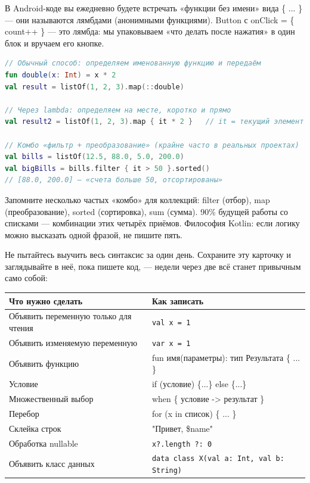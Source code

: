 
В Android-коде вы ежедневно будете встречать «функции без имени» вида \{ ... \} — они называются лямбдами (анонимными функциями). Button с onClick = \{ count++ \} — это лямбда: мы упаковываем «что делать после нажатия» в один блок и вручаем его кнопке.

\begin{lstlisting}[language=Kotlin]
// Обычный способ: определяем именованную функцию и передаём
fun double(x: Int) = x * 2
val result = listOf(1, 2, 3).map(::double)

// Через lambda: определяем на месте, коротко и прямо
val result2 = listOf(1, 2, 3).map { it * 2 }   // it = текущий элемент

// Комбо «фильтр + преобразование» (крайне часто в реальных проектах)
val bills = listOf(12.5, 88.0, 5.0, 200.0)
val bigBills = bills.filter { it > 50 }.sorted()
// [88.0, 200.0] — «счета больше 50, отсортированы»
\end{lstlisting}

Запомните несколько частых «комбо» для коллекций: filter (отбор), map (преобразование), sorted (сортировка), sum (сумма). 90\% будущей работы со списками — комбинации этих четырёх приёмов. Философия Kotlin: если логику можно высказать одной фразой, не пишите пять.


Не пытайтесь выучить весь синтаксис за один день. Сохраните эту карточку и заглядывайте в неё, пока пишете код, — недели через две всё станет привычным само собой:

\begin{center}
\begin{tabularx}{\linewidth}{|X|X|}
\hline
\textbf{Что нужно сделать} & \textbf{Как записать} \tabularnewline
\hline
Объявить переменную только для чтения & \texttt{val x = 1} \tabularnewline
Объявить изменяемую переменную & \texttt{var x = 1} \tabularnewline
Объявить функцию & fun имя(параметры): тип Результата \{ ... \} \tabularnewline
Условие & if (условие) \{...\} else \{...\} \tabularnewline
Множественный выбор & when \{ условие -> результат \} \tabularnewline
Перебор & for (x in список) \{ ... \} \tabularnewline
Склейка строк & "Привет, \$name" \tabularnewline
Обработка nullable & \texttt{x?.\allowbreak length ?: 0} \tabularnewline
Объявить класс данных & \texttt{data class X(val a: Int, val b: String)} \tabularnewline
\hline
\end{tabularx}
\end{center}

